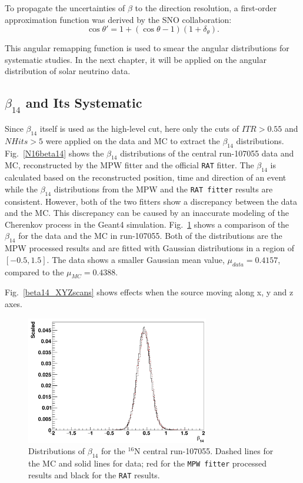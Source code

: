 To propagate the uncertainties of $\beta$ to the direction resolution, a first-order approximation function was derived by the SNO collaboration\cite{drouin2012three}:
\begin{equation}\label{remapTheta}
\cos\theta'=1+(\cos\theta-1)(1+\delta_{\theta}).
\end{equation} 

This angular remapping function is used to smear the angular distributions for systematic studies. In the next chapter, it will be applied on the angular distribution of solar neutrino data. 

\subsection{$\beta_{14}$ and Its Systematic}
Since $\beta_{14}$ itself is used as the high-level cut, here only the cuts of $ITR>0.55$ and $NHits>5$ were applied on the data and MC to extract the $\beta_{14}$ distributions.
Fig.~\ref{N16beta14} shows the $\beta_{14}$ distributions of the central run-107055 data and MC, reconstructed by the MPW fitter and the official \texttt{RAT} fitter. The $\beta_{14}$ is calculated based on the reconstructed position, time and direction of an event while the $\beta_{14}$ distributions from the MPW and the \texttt{RAT fitter} results are consistent. However, both of the two fitters show a discrepancy between the data and the MC. This discrepancy can be caused by an inaccurate modeling of the Cherenkov process in the Geant4 simulation\cite{dunmore2004separation,beta14discrepancy}.
Fig.~\ref{N16beta14_cmp} shows a comparison of the $\beta_{14}$ for the data and the MC in run-107055. Both of the distributions are the MPW processed results and are fitted with Gaussian distributions in a region of $[-0.5,1.5]$. The data shows a smaller Gaussian mean value, $\mu_{data}=0.4157$, compared to the $\mu_{MC}=0.4388$.

Fig.~\ref{beta14_XYZscans} shows effects when the source moving along x, y and z axes.

\begin{figure}[htbp]
	\centering
	\includegraphics[width=8cm]{N16_beta14_107055.png}
	\caption{Distributions of $\beta_{14}$ for the $^{16}$N central run-107055. Dashed lines for the MC and solid lines for data; red for the \texttt{MPW fitter} processed results and black for the \texttt{RAT} results.}
	\label{N16beta14_cmp}
\end{figure}

